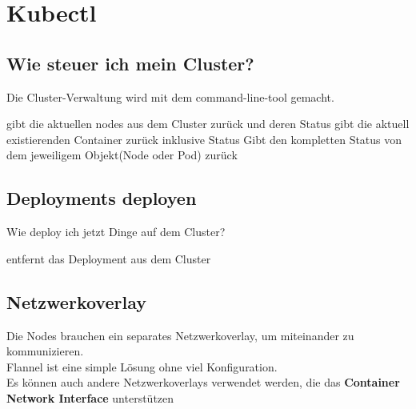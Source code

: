\section{Kubectl}
\subsection{Wie steuer ich mein Cluster?}
\begin{frame}
    \slidehead
    \Large
    \centering
    Die Cluster-Verwaltung wird mit dem command-line-tool
    gemacht.
\end{frame}

\begin{frame}
    \slidehead
    \vspace{-0.5em}
    gibt die aktuellen nodes aus dem Cluster zurück und deren Status
    gibt die aktuell existierenden Container zurück inklusive Status
    Gibt den kompletten Status von dem jeweiligem Objekt(Node oder Pod) zurück
\end{frame}

\subsection{Deployments deployen}
\begin{frame}
    \slidehead
    \vspace{-0.5em}
    \Large
    \begin{center}
    Wie deploy ich jetzt Dinge auf dem Cluster?
    \normalsize
    
    \vspace{1em}
    entfernt das Deployment aus dem Cluster
    \end{center}
\end{frame}

\subsection{Netzwerkoverlay}
\begin{frame}
    \slidehead
    \Large
    \centering
    Die Nodes brauchen ein separates Netzwerkoverlay, um miteinander zu kommunizieren. \\
    Flannel ist eine simple Lösung ohne viel Konfiguration. \\
    Es können auch andere Netzwerkoverlays verwendet werden, die das \textbf{Container Network Interface} unterstützen
    \normalsize
\end{frame}